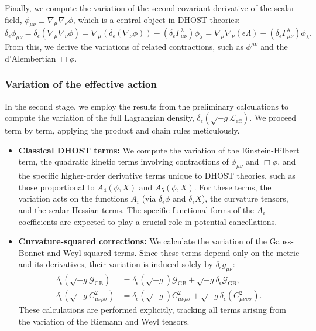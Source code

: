 \documentclass[twocolumn]{aastex631}
\begin{document}
Finally, we compute the variation of the second covariant derivative of the scalar field, $\phi_{\mu\nu} \equiv \nabla_\mu\nabla_\nu \phi$, which is a central object in DHOST theories:
\begin{equation}
    \delta_\epsilon \phi_{\mu\nu} = \delta_\epsilon (\nabla_\mu\nabla_\nu \phi) = \nabla_\mu(\delta_\epsilon(\nabla_\nu\phi)) - (\delta_\epsilon \Gamma^\lambda_{\mu\nu})\phi_\lambda = \nabla_\mu\nabla_\nu(\epsilon\Lambda) - (\delta_\epsilon \Gamma^\lambda_{\mu\nu})\phi_\lambda.
\end{equation}
From this, we derive the variations of related contractions, such as $\phi^{\mu\nu}$ and the d'Alembertian $\Box\phi$.

\subsubsection{Variation of the effective action}
In the second stage, we employ the results from the preliminary calculations to compute the variation of the full Lagrangian density, $\delta_\epsilon(\sqrt{-g}\mathcal{L}_{\text{eff}})$. We proceed term by term, applying the product and chain rules meticulously.
\begin{itemize}
    \item \textbf{Classical DHOST terms:} We compute the variation of the Einstein-Hilbert term, the quadratic kinetic terms involving contractions of $\phi_{\mu\nu}$ and $\Box\phi$, and the specific higher-order derivative terms unique to DHOST theories, such as those proportional to $A_4(\phi, X)$ and $A_5(\phi, X)$. For these terms, the variation acts on the functions $A_i$ (via $\delta_\epsilon \phi$ and $\delta_\epsilon X$), the curvature tensors, and the scalar Hessian terms. The specific functional forms of the $A_i$ coefficients are expected to play a crucial role in potential cancellations.

    \item \textbf{Curvature-squared corrections:} We calculate the variation of the Gauss-Bonnet and Weyl-squared terms. Since these terms depend only on the metric and its derivatives, their variation is induced solely by $\delta_\epsilon g_{\mu\nu}$:
    \begin{align}
        \delta_\epsilon(\sqrt{-g} \mathcal{G}_{\text{GB}}) &= \delta_\epsilon(\sqrt{-g}) \mathcal{G}_{\text{GB}} + \sqrt{-g} \delta_\epsilon \mathcal{G}_{\text{GB}}, \\
        \delta_\epsilon(\sqrt{-g} C_{\mu\nu\rho\sigma}^2) &= \delta_\epsilon(\sqrt{-g}) C_{\mu\nu\rho\sigma}^2 + \sqrt{-g} \delta_\epsilon (C_{\mu\nu\rho\sigma}^2).
    \end{align}
    These calculations are performed explicitly, tracking all terms arising from the variation of the Riemann and Weyl tensors.
\end{itemize}
\end{document}
